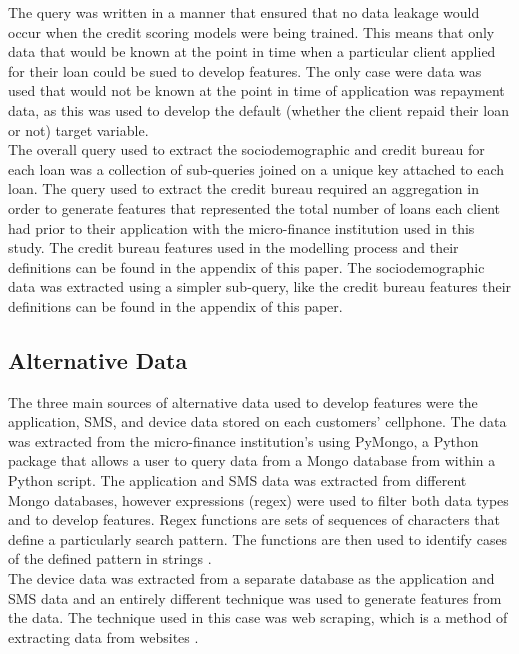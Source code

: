 The query was written in a manner that ensured that no data leakage would occur when the credit scoring models were being trained. This means that only data that would be known at the point in time when a particular client applied for their loan could be sued to develop features. The only case were data was used that would not be known at the point in time of application was repayment data, as this was used to develop the default (whether the client repaid their loan or not) target variable. \\

The overall query used to extract the sociodemographic and credit bureau for each loan was a collection of sub-queries joined on a unique key attached to each loan. The query used to extract the credit bureau required an aggregation in order to generate features that represented the total number of loans each client had prior to their application with the micro-finance institution used in this study. The credit bureau features used in the modelling process and their definitions can be found in the appendix of this paper. The sociodemographic data was extracted using a simpler sub-query,  like the credit bureau features their definitions can be found in the appendix of this paper.  \\


\subsection{Alternative Data}

The three main sources of alternative data used to develop features were the application, SMS, and device data stored on each customers' cellphone. The data was extracted from the micro-finance institution's using PyMongo, a Python package that allows a user to query data from a Mongo database from within a Python script. The application and SMS data was extracted from different Mongo databases, however expressions (regex) were used to filter both data types and to develop features. Regex functions are sets of sequences of characters that define a particularly search pattern. The functions are then used to identify cases of the defined pattern in strings \parencite{Regex}. \\

The device data was extracted from a separate database as the application and SMS data and an entirely different technique was used to generate features from the data. The technique used in this case was web scraping, which is a method of extracting data from websites \parencite{WebScraping}. 

